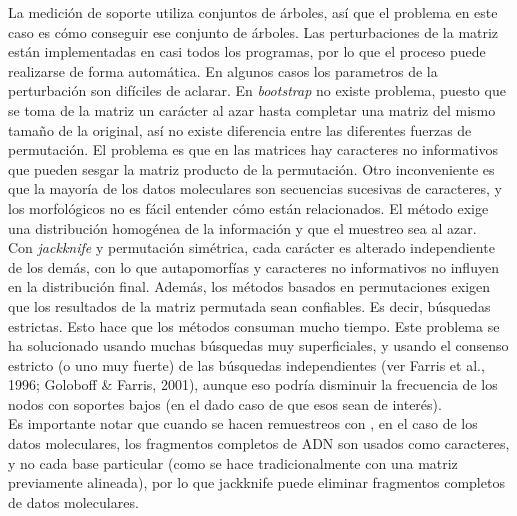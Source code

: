 La medici\'on de soporte utiliza conjuntos de \'arboles, as\'i que el problema en este caso es c\'omo conseguir ese conjunto de \'arboles. Las perturbaciones de la matriz est\'an implementadas en casi todos los programas, por lo que el proceso puede realizarse de forma autom\'atica. En algunos casos los parametros de la perturbaci\'on son dif\'iciles de aclarar. En \textit{bootstrap} no existe problema, puesto que se toma de la matriz un car\'acter al azar hasta completar una matriz del mismo tama\~no de la original, as\'i no existe diferencia entre las diferentes fuerzas de permutaci\'on. El problema es que en las matrices hay caracteres no informativos que pueden sesgar la matriz producto de la permutaci\'on. Otro inconveniente es que la mayor\'ia de los datos moleculares son secuencias sucesivas de caracteres, y los morfol\'ogicos no es f\'acil entender c\'omo est\'an relacionados. El m\'etodo exige una distribuci\'on homog\'enea de la informaci\'on y que el muestreo sea al azar.\\
Con \textit{jackknife} y permutaci\'on sim\'etrica, cada car\'acter es alterado independiente de los dem\'as, con lo que autapomorf\'ias y caracteres no informativos no influyen en la distribuci\'on final. Adem\'as, los m\'etodos basados en permutaciones exigen que los resultados de la matriz permutada sean confiables. Es decir, b\'usquedas estrictas. Esto hace que los m\'etodos consuman mucho tiempo. Este problema se ha solucionado usando muchas b\'usquedas muy superficiales, y usando el consenso estricto (o uno muy fuerte) de las b\'usquedas independientes (ver Farris et al., 1996; Goloboff \& Farris, 2001), aunque eso podr\'ia disminuir la frecuencia de los nodos con soportes bajos (en el dado caso de que esos sean de inter\'es).\\
Es importante notar que cuando se hacen remuestreos con , en el caso de los datos moleculares, los fragmentos completos de ADN son usados como caracteres, y no cada base particular (como se hace tradicionalmente con una matriz previamente alineada), por lo que jackknife puede eliminar fragmentos completos de datos moleculares.\\
